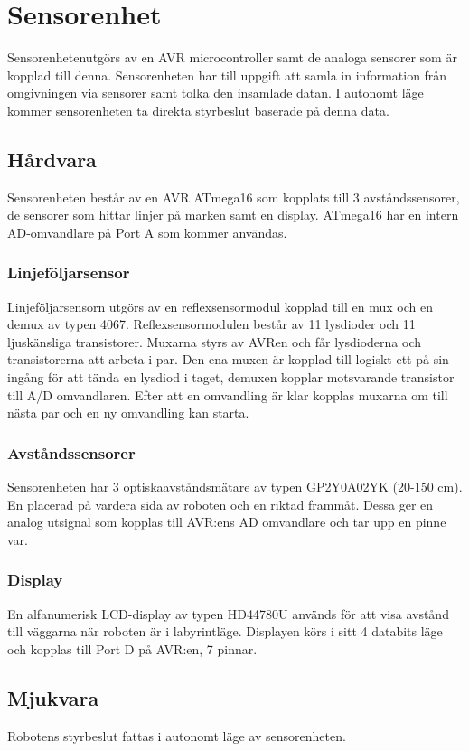 \section{Sensorenhet}
Sensorenhetenutgörs av en AVR microcontroller samt de analoga sensorer som är kopplad till denna. Sensorenheten har till uppgift att samla in information från omgivningen via sensorer samt tolka den insamlade datan. I autonomt läge kommer sensorenheten ta direkta styrbeslut baserade på denna data. 

\subsection{Hårdvara}
Sensorenheten består av en AVR ATmega16 som kopplats till 3 avståndssensorer, de sensorer som hittar linjer på marken samt en display. ATmega16 har en intern AD-omvandlare på Port A som kommer användas.

\subsubsection{Linjeföljarsensor}
Linjeföljarsensorn utgörs av en reflexsensormodul kopplad till en mux och en demux av typen 4067. Reflexsensormodulen består av 11 lysdioder och 11 ljuskänsliga transistorer.  Muxarna styrs av AVRen och får lysdioderna och transistorerna att arbeta i par. Den ena muxen är kopplad till logiskt ett på sin ingång för att tända en lysdiod i taget, demuxen kopplar motsvarande transistor till A/D omvandlaren. Efter att en omvandling är klar kopplas muxarna om till nästa par och en ny omvandling kan starta.

\subsubsection{Avståndssensorer}
Sensorenheten har 3 optiskaavståndsmätare av typen GP2Y0A02YK (20-150 cm). En placerad på vardera sida av roboten och en riktad frammåt. Dessa ger en analog utsignal som kopplas till AVR:ens AD omvandlare och tar upp en pinne var.

\subsubsection{Display}
En alfanumerisk LCD-display av typen HD44780U används för att visa avstånd till väggarna när roboten är i labyrintläge. Displayen körs i sitt 4 databits läge och kopplas till Port D på AVR:en, 7 pinnar.


\subsection{Mjukvara}
Robotens styrbeslut fattas i autonomt läge av sensorenheten. 

